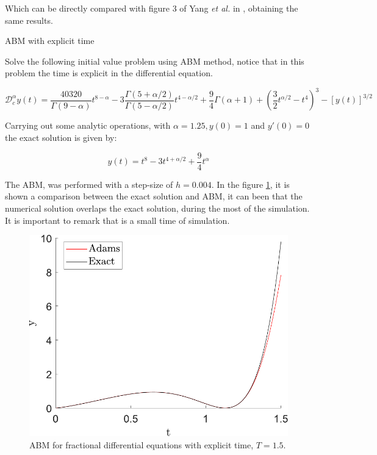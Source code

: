 Which can be directly compared with figure 3 of Yang \textit{et al.} in \cite{yang2018generation}, obtaining the same results.

\begin{exmp}\label{ex:adam_disp}
ABM with explicit time
\end{exmp}

Solve the following initial value problem using ABM method, notice that in this problem the time is explicit in the differential equation.

\begin{equation} 
\mathcal{D}_{c}^{\alpha} y(t)= \frac{40320}{\Gamma(9-\alpha)} t^{8-\alpha}-3 \frac{\Gamma(5+\alpha / 2)}{\Gamma(5-\alpha / 2)} t^{4-\alpha / 2}+\frac{9}{4} \Gamma(\alpha+1)+\left(\frac{3}{2} t^{\alpha / 2}-t^{4}\right)^{3}-[y(t)]^{3 / 2} 
\end{equation}

Carrying out some analytic operations, with $\alpha=1.25 , y(0) = 1$ and $y'(0)=0$ the exact solution is given by:

\begin{equation}
    y(t) = t^{8}-3 t^{4+\alpha /2}+\frac{9}{4} t^{\alpha}
\end{equation}

The ABM, was performed with a step-size of $h=0.004$. In the figure \ref{fig:adam_disp}, it is shown a comparison between the exact solution and ABM, it can been that the numerical solution overlaps the exact solution, during the most of the simulation. It is important to remark that is a small time of simulation.

\begin{figure}[H]
    \centering
    \includegraphics[scale=0.5]{files/adams_exact_xt_with_dispersion.pdf}
    \caption{ABM for fractional differential equations with explicit time, $T=1.5$.}
    \label{fig:adam_disp}
\end{figure}

